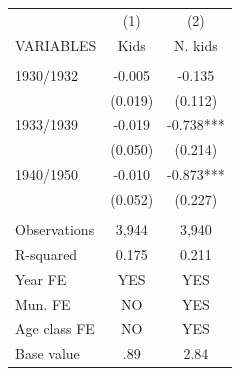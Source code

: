 \begin{tabular}{lcc} \hline
 & (1) & (2) \\
VARIABLES & Kids & N. kids \\ \hline
 &  &  \\
1930/1932 & -0.005 & -0.135 \\
 & (0.019) & (0.112) \\
1933/1939 & -0.019 & -0.738*** \\
 & (0.050) & (0.214) \\
1940/1950 & -0.010 & -0.873*** \\
 & (0.052) & (0.227) \\
 &  &  \\
Observations & 3,944 & 3,940 \\
R-squared & 0.175 & 0.211 \\
Year FE & YES & YES \\
Mun. FE & NO & YES \\
Age class FE & NO & YES \\
 Base value & .89 & 2.84 \\ \hline
\end{tabular}
